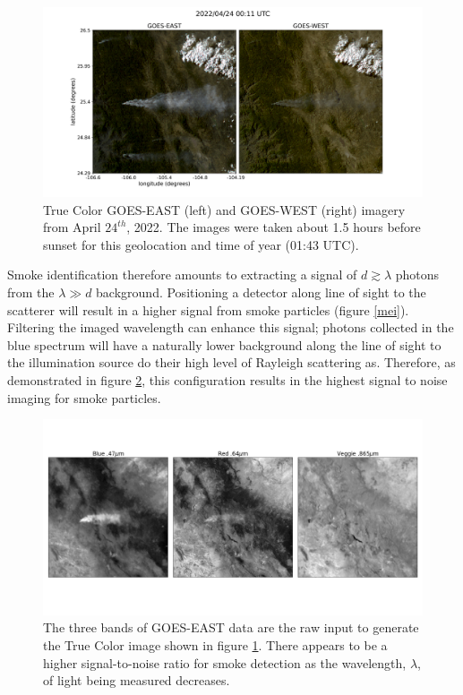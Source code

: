 \documentclass{ametsocV6.1}
\begin{document}
\begin{figure}\label{16_vs_17}
    \centering
    \includegraphics[width=15cm]{figures/G16_v_G17.png}
    \caption{True Color GOES-EAST (left) and GOES-WEST (right) imagery from April $24^{th}$, 2022. The images were taken about 1.5 hours before sunset for this geolocation and time of year (01:43 UTC).}\label{16vs17}
\end{figure}

Smoke identification therefore amounts to extracting a signal of $d \gtrsim \lambda$ photons from the $\lambda \gg d$ background. Positioning a detector along line of sight to the scatterer will result in a higher signal from smoke particles (figure \ref{mei}). Filtering the imaged wavelength can enhance this signal; photons collected in the blue spectrum will have a naturally lower background along the line of sight to the illumination source do their high level of Rayleigh scattering as. Therefore, as demonstrated in figure \ref{bands}, this configuration results in the highest signal to noise imaging for smoke particles. 



\begin{figure}
    \centering
    \includegraphics[width=16cm]{figures/GOES16_bands.png}
    \caption{The three bands of GOES-EAST data are the raw input to generate the True Color image shown in figure \ref{16vs17}. There appears to be a higher signal-to-noise ratio for smoke detection as the wavelength, $\lambda$, of light being measured decreases.}\label{bands}
\end{figure}
\end{document}
